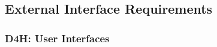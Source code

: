 {\color{Blue}\subsection{External Interface Requirements}}
{\color{Blue}\subsubsection{D4H: User Interfaces}}

